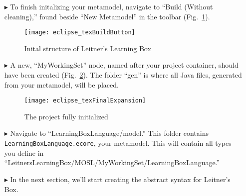\begin{itemize}
\item[$\blacktriangleright$] To finish initalizing your metamodel, navigate to ``Build (Without cleaning),'' found beside ``New Metamodel'' in the
toolbar (Fig.~\ref{fig:preBuild}).

\vspace{0.25cm}

\begin{figure}[htbp]
	\centering
  \texttt{[image: eclipse\_texBuildButton]}
	\caption{Inital structure of Leitner's Learning Box}
	\label{fig:preBuild}
\end{figure} 

\vspace{0.25cm}

\item[$\blacktriangleright$] A new, ``MyWorkingSet'' node, named after your project container, should have been created (Fig.~\ref{fig:finalFiles}). The folder
``gen'' is where all Java files, generated from your metamodel, will be placed.

\newpage

\begin{figure}[htbp]
	\centering
  \texttt{[image: eclipse\_texFinalExpansion]}
	\caption{The project fully initialized}
	\label{fig:finalFiles}
\end{figure} 

\vspace{0.5cm}

\item[$\blacktriangleright$] Navigate to ``LearningBoxLanguage/model.'' This folder contains \\ \texttt{LearningBoxLanguage.ecore}, your metamodel. This will
contain all types you define in ``LeitnersLearningBox/MOSL/MyWorkingSet/LearningBoxLanguage.''
\vspace{0.5cm}

\item[$\blacktriangleright$] In the next section, we'll start creating the abstract syntax for Leitner's Box.


\end{itemize}

